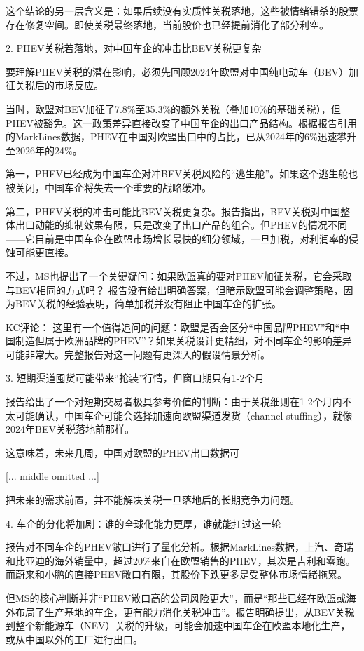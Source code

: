 \documentclass[11pt]{ctexart}
\begin{document}
这个结论的另一层含义是：如果后续没有实质性关税落地，这些被情绪错杀的股票存在修复空间。即使关税最终落地，当前股价也已经提前消化了部分利空。

2. PHEV关税若落地，对中国车企的冲击比BEV关税更复杂

要理解PHEV关税的潜在影响，必须先回顾2024年欧盟对中国纯电动车（BEV）加征关税后的市场反应。

当时，欧盟对BEV加征了7.8\%至35.3\%的额外关税（叠加10\%的基础关税），但PHEV被豁免。这一政策差异直接改变了中国车企的出口产品结构。根据报告引用的MarkLines数据，PHEV在中国对欧盟出口中的占比，已从2024年的6\%迅速攀升至2026年的24\%。

第一，PHEV已经成为中国车企对冲BEV关税风险的“逃生舱”。如果这个逃生舱也被关闭，中国车企将失去一个重要的战略缓冲。

第二，PHEV关税的冲击可能比BEV关税更复杂。报告指出，BEV关税对中国整体出口动能的抑制效果有限，只是改变了出口产品的组合。但PHEV的情况不同——它目前是中国车企在欧盟市场增长最快的细分领域，一旦加税，对利润率的侵蚀可能更直接。

不过，MS也提出了一个关键疑问：如果欧盟真的要对PHEV加征关税，它会采取与BEV相同的方式吗？ 报告没有给出明确答案，但暗示欧盟可能会调整策略，因为BEV关税的经验表明，简单加税并没有阻止中国车企的扩张。

KC评论： 这里有一个值得追问的问题：欧盟是否会区分“中国品牌PHEV”和“中国制造但属于欧洲品牌的PHEV”？如果关税设计更精细，对不同车企的影响差异可能非常大。完整报告对这一问题有更深入的假设情景分析。

3. 短期渠道囤货可能带来“抢装”行情，但窗口期只有1-2个月

报告给出了一个对短期交易者极具参考价值的判断：由于关税细则在1-2个月内不太可能确认，中国车企可能会选择加速向欧盟渠道发货（channel stuffing），就像2024年BEV关税落地前那样。

这意味着，未来几周，中国对欧盟的PHEV出口数据可

[... middle omitted ...]

把未来的需求前置，并不能解决关税一旦落地后的长期竞争力问题。

4. 车企的分化将加剧：谁的全球化能力更厚，谁就能扛过这一轮

报告对不同车企的PHEV敞口进行了量化分析。根据MarkLines数据，上汽、奇瑞和比亚迪的海外销量中，超过20\%来自在欧盟销售的PHEV，其次是吉利和零跑。而蔚来和小鹏的直接PHEV敞口有限，其股价下跌更多是受整体市场情绪拖累。

但MS的核心判断并非“PHEV敞口高的公司风险更大”，而是“那些已经在欧盟或海外布局了生产基地的车企，更有能力消化关税冲击”。报告明确提出，从BEV关税到整个新能源车（NEV）关税的升级，可能会加速中国车企在欧盟本地化生产，或从中国以外的工厂进行出口。
\end{document}
